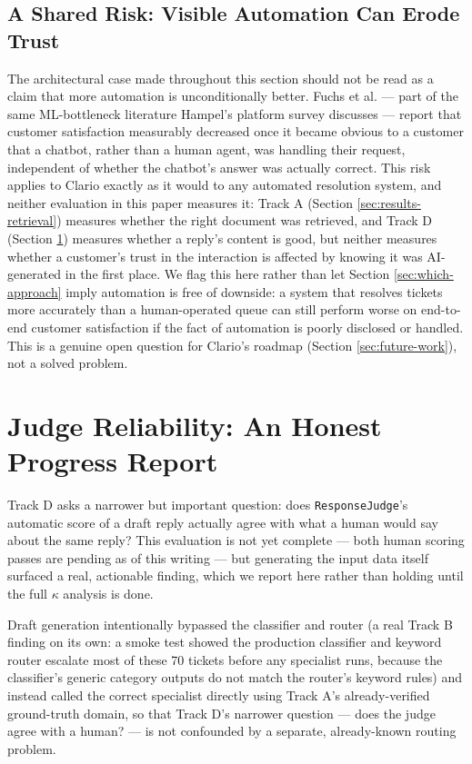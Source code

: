 \documentclass[conference]{IEEEtran}
\begin{document}
\subsection{A Shared Risk: Visible Automation Can Erode Trust}
\label{sec:trust-risk}
The architectural case made throughout this section should not be read as a claim that more automation is unconditionally better. Fuchs et al. \cite{fuchs2022} --- part of the same ML-bottleneck literature Hampel's platform survey \cite{hampel2024} discusses --- report that customer satisfaction measurably decreased once it became obvious to a customer that a chatbot, rather than a human agent, was handling their request, independent of whether the chatbot's answer was actually correct. This risk applies to Clario exactly as it would to any automated resolution system, and neither evaluation in this paper measures it: Track A (Section \ref{sec:results-retrieval}) measures whether the right document was retrieved, and Track D (Section \ref{sec:trackd}) measures whether a reply's content is good, but neither measures whether a customer's trust in the interaction is affected by knowing it was AI-generated in the first place. We flag this here rather than let Section \ref{sec:which-approach} imply automation is free of downside: a system that resolves tickets more accurately than a human-operated queue can still perform worse on end-to-end customer satisfaction if the fact of automation is poorly disclosed or handled. This is a genuine open question for Clario's roadmap (Section \ref{sec:future-work}), not a solved problem.

\section{Judge Reliability: An Honest Progress Report}
\label{sec:trackd}

Track D asks a narrower but important question: does \texttt{ResponseJudge}'s automatic score of a draft reply actually agree with what a human would say about the same reply? This evaluation is not yet complete --- both human scoring passes are pending as of this writing --- but generating the input data itself surfaced a real, actionable finding, which we report here rather than holding until the full $\kappa$ analysis is done.

Draft generation intentionally bypassed the classifier and router (a real Track B finding on its own: a smoke test showed the production classifier and keyword router escalate most of these 70 tickets before any specialist runs, because the classifier's generic category outputs do not match the router's keyword rules) and instead called the correct specialist directly using Track A's already-verified ground-truth domain, so that Track D's narrower question --- does the judge agree with a human? --- is not confounded by a separate, already-known routing problem.
\end{document}
